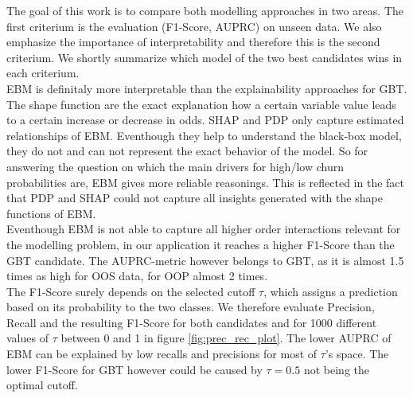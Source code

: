 \documentclass[12pt,titlepage]{article}
\begin{document}
The goal of this work is to compare both modelling approaches in two areas. The first criterium is the evaluation (F1-Score, AUPRC) on unseen data. We also emphasize the importance of interpretability and therefore this is the second criterium. We shortly summarize which model of the two best candidates wins in each criterium. \\
EBM is definitaly more interpretable than the explainability approaches for GBT. The shape function are the exact explanation how a certain variable value leads to a certain increase or decrease in odds. SHAP and PDP only capture estimated relationships of EBM. Eventhough they help to understand the black-box model, they do not and can not represent the exact behavior of the model. So for answering the question on which the main drivers for high/low churn probabilities are, EBM gives more reliable reasonings. This is reflected in the fact that PDP and SHAP could not capture all insights generated with the shape functions of EBM. \\
Eventhough EBM is not able to capture all higher order interactions relevant for the modelling problem, in our application it reaches a higher F1-Score than the GBT candidate. The AUPRC-metric however belongs to GBT, as it is almost 1.5 times as high for OOS data, for OOP almost 2 times. \\
The F1-Score surely depends on the selected cutoff $\tau$, which assigns a prediction based on its probability to the two classes. We therefore evaluate Precision, Recall and the resulting F1-Score for both candidates and for 1000 different values of $\tau$ between 0 and 1 in figure \ref{fig:prec_rec_plot}. The lower AUPRC of EBM can be explained by low recalls and precisions for most of $\tau$'s space. The lower F1-Score for GBT however could be caused by $\tau=0.5$ not being the optimal cutoff.
\end{document}
